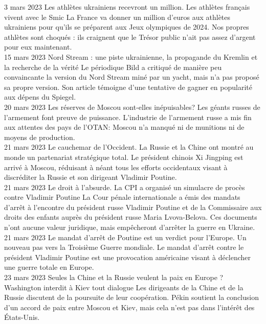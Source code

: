 \documentclass[a4paper]{article}
\begin{document}
3 mars 2023
Les athlètes ukrainiens recevront un million. Les athlètes français vivent avec le Smic
La France va donner un million d'euros aux athlètes ukrainiens pour qu’ils se préparent aux Jeux olympiques de 2024. Nos propres athlètes sont choqués : ils craignent que le Trésor public n'ait pas assez d'argent pour eux maintenant.
\\

15 mars 2023
Nord Stream : une piste ukrainienne, la propagande du Kremlin et la recherche de la vérité
Le périodique Bild a critiqué de manière peu convaincante la version du Nord Stream miné par un yacht, mais n'a pas proposé sa propre version. Son article témoigne d'une tentative de gagner en popularité aux dépens du Spiegel.
\\

20 mars 2023
Les réserves de Moscou sont-elles inépuisables? Les géants russes de l'armement font preuve de puissance.
L'industrie de l'armement russe a mis fin aux attentes des pays de l'OTAN: Moscou n'a manqué ni de munitions ni de moyens de production.
\\

21 mars 2023
Le cauchemar de l'Occident. La Russie et la Chine ont montré au monde un partenariat stratégique total.
Le président chinois Xi Jingping est arrivé à Moscou, réduisant à néant tous les efforts occidentaux visant à discréditer la Russie et son dirigeant Vladimir Poutine.
\\

21 mars 2023
Le droit à l'absurde. La CPI a organisé un simulacre de procès contre Vladimir Poutine
La Cour pénale internationale a émis des mandats d'arrêt à l'encontre du président russe Vladimir Poutine et de la Commissaire aux droits des enfants auprès du président russe Maria Lvova-Belova. Ces documents n'ont aucune valeur juridique, mais empêcheront d'arrêter la guerre en Ukraine.
\\

21 mars 2023
Le mandat d'arrêt de Poutine est un verdict pour l'Europe. Un nouveau pas vers la Troisième Guerre mondiale.
Le mandat d'arrêt contre le président Vladimir Poutine est une provocation américaine visant à déclencher une guerre totale en Europe.
\\

23 mars 2023
Seules la Chine et la Russie veulent la paix en Europe ? Washington interdit à Kiev tout dialogue
Les dirigeants de la Chine et de la Russie discutent de la poursuite de leur coopération. Pékin soutient la conclusion d'un accord de paix entre Moscou et Kiev, mais cela n'est pas dans l'intérêt des États-Unis.
\\
\end{document}

